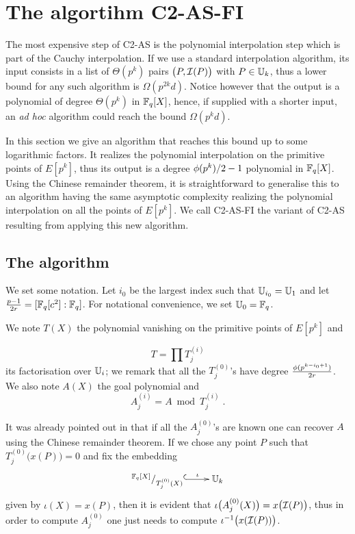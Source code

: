 \section{The algortihm C2-AS-FI}
\label{sec:C2-AS-FI}

The most expensive step of C2-AS is the polynomial interpolation step
which is part of the Cauchy interpolation. If we use a standard
interpolation algorithm, its input consists in a list of $\Theta(p^k)$
pairs $\bigl(P, \mathcal{I}(P)\bigr)$ with $P\in\mathbb{U}_k$, thus a lower bound for
any such algorithm is $\Omega(p^{2k}d)$. Notice however that the
output is a polynomial of degree $\Theta(p^k)$ in $\mathbb{F}_q[X]$, hence, if
supplied with a shorter input, an \emph{ad hoc} algorithm could reach
the bound $\Omega(p^kd)$.

In this section we give an algorithm that reaches this bound up to
some logarithmic factors. It realizes the polynomial interpolation on
the primitive points of $E[p^k]$, thus its output is a degree
$\phi(p^k)/2-1$ polynomial in $\mathbb{F}_q[X]$. Using the Chinese remainder
theorem, it is straightforward to generalise this to an algorithm
having the same asymptotic complexity realizing the polynomial
interpolation on all the points of $E[p^k]$. We call C2-AS-FI the
variant of C2-AS resulting from applying this new algorithm.

\subsection{The algorithm}
We set some notation. Let $i_0$ be the largest index such that
$\mathbb{U}_{i_0} = \mathbb{U}_1$ and let $\frac{p-1}{2r} = [\mathbb{F}_q[c^2]:\mathbb{F}_q]$. For
notational convenience, we set $\mathbb{U}_0=\mathbb{F}_q$.

We note $T(X)$ the polynomial vanishing on the primitive points of
$E[p^k]$ and

\begin{equation}
  \label{eq:T}
  T = \prod T_j^{(i)}
\end{equation}
its factorisation over $\mathbb{U}_i$; we remark that all the $T_j^{(0)}$'s
have degree $\frac{\phi(p^{k-i_0+1})}{2r}$. We also note $A(X)$ the goal
polynomial and
\begin{equation}
  \label{eq:A}
  A_j^{(i)} = A \bmod T_j^{(i)}
  \;\text{.}
\end{equation}

It was already pointed out in \cite[$\S$2.3]{Cou96} that if all the
$A_j^{(0)}$'s are known one can recover $A$ using the Chinese remainder
theorem. If we chose any point $P$ such that
$T_j^{(0)}\bigl(x(P)\bigr)=0$ and fix the embedding
\begin{equation}
  \label{eq:embed}
  \xymatrix{
    ^{\F_q[X]}/_{T_j^{(0)}(X)} \ar@{^{(}->}[r]^-\iota & \U_k
  }
\end{equation}
given by $\iota(X) = x(P)$, then it is evident that
$\iota\bigl(A_j^{(0)}(X)\bigr) = x\bigl(\mathcal{I}(P)\bigr)$, thus in order to
compute $A_j^{(0)}$ one just needs to compute
$\iota^{-1}\bigl(x(\mathcal{I}(P))\bigr)$.

